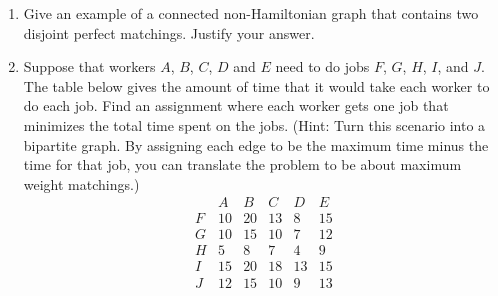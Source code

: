\documentclass[12pt]{article}
\begin{document}
\begin{enumerate}
  \item Give an example of a connected non-Hamiltonian graph that contains two disjoint perfect matchings.  Justify your answer.
  \item Suppose that workers $A$, $B$, $C$, $D$ and $E$ need to do jobs $F$, $G$, $H$, $I$,  and $J$. The table below gives the amount of time that it would take each worker to do each job. Find an assignment where each worker gets one job that minimizes the total time spent on the jobs. (Hint: Turn this scenario into a bipartite graph. By assigning each edge to be the maximum time minus the time for that job, you can translate the problem to be about maximum weight matchings.)
  $$\begin{array}{c|ccccc}
  & A & B & C & D & E\\ \hline
  F & 10 &20 & 13 &8 &15\\
  G & 10 & 15 & 10 & 7 & 12\\
  H & 5 & 8 & 7 & 4 & 9\\
  I & 15 & 20 & 18 & 13 & 15\\
  J & 12 & 15 & 10 & 9 & 13
\end{array}   $$
\end{enumerate}
\end{document}
